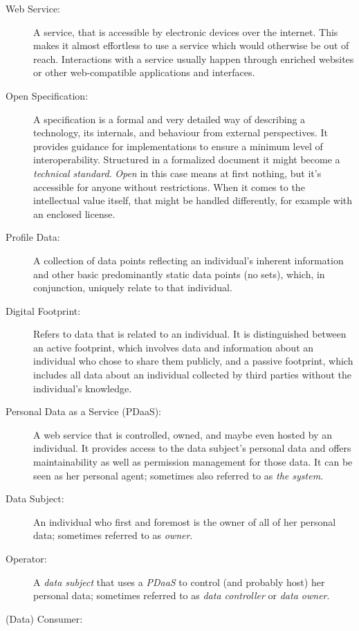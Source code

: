 \documentclass[12pt,english,a4paper,titlepage,cleardoublepage=empty,dottedtoc]{report}
\begin{document}
\begin{description}
\item[Web Service:]
A service, that is accessible by electronic devices over the internet.
This makes it almost effortless to use a service which would otherwise
be out of reach. Interactions with a service usually happen through
enriched websites or other web-compatible applications and interfaces.
\item[Open Specification:]
A specification is a formal and very detailed way of describing a
technology, its internals, and behaviour from external perspectives. It
provides guidance for implementations to ensure a minimum level of
interoperability. Structured in a formalized document it might become a
\emph{technical standard}. \emph{Open} in this case means at first
nothing, but it's accessible for anyone without restrictions. When it
comes to the intellectual value itself, that might be handled
differently, for example with an enclosed license.
\item[\protect\hypertarget{terminologies--profile-data}{}{Profile
Data}:]
A collection of data points reflecting an individual's inherent
information and other basic predominantly static data points (no sets),
which, in conjunction, uniquely relate to that individual.
\item[\protect\hypertarget{terminologies--digital-footprint}{}{Digital
Footprint}:]
Refers to data that is related to an individual. It is distinguished
between an active footprint, which involves data and information about
an individual who chose to share them publicly, and a passive footprint,
which includes all data about an individual collected by third parties
without the individual's knowledge.
\item[Personal Data as a Service (PDaaS):]
A web service that is controlled, owned, and maybe even hosted by an
individual. It provides access to the data subject's personal data and
offers maintainability as well as permission management for those data.
It can be seen as her personal agent; sometimes also referred to as
\emph{the system}.
\item[Data Subject:]
An individual who first and foremost is the owner of all of her personal
data; sometimes referred to as \emph{owner}.
\item[\protect\hypertarget{terminologies--operator}{}{Operator}:]
A \emph{data subject} that uses a \emph{PDaaS} to control (and probably
host) her personal data; sometimes referred to as \emph{data controller}
or \emph{data owner}.
\item[\protect\hypertarget{terminologies--consumer}{}{(Data) Consumer}:]

\end{description}
\end{document}
